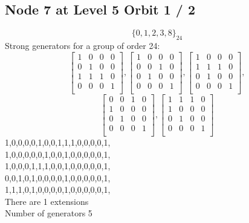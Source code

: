 \subsection*{Node 7 at Level 5 Orbit 1 / 2}
$$
\{ 0, 1, 2, 3, 8 \}_{24}$$
{\small\arraycolsep=2pt
Strong generators for a group of order 24:
$$
\left[
\begin{array}{*{4}{r}}
1 & 0 & 0 & 0\\
0 & 1 & 0 & 0\\
1 & 1 & 1 & 0\\
0 & 0 & 0 & 1\\
\end{array}
\right]
, 
\left[
\begin{array}{*{4}{r}}
1 & 0 & 0 & 0\\
0 & 0 & 1 & 0\\
0 & 1 & 0 & 0\\
0 & 0 & 0 & 1\\
\end{array}
\right]
, 
\left[
\begin{array}{*{4}{r}}
1 & 0 & 0 & 0\\
1 & 1 & 1 & 0\\
0 & 1 & 0 & 0\\
0 & 0 & 0 & 1\\
\end{array}
\right]
, 
$$
$$
\left[
\begin{array}{*{4}{r}}
0 & 0 & 1 & 0\\
1 & 0 & 0 & 0\\
0 & 1 & 0 & 0\\
0 & 0 & 0 & 1\\
\end{array}
\right]
, 
\left[
\begin{array}{*{4}{r}}
1 & 1 & 1 & 0\\
1 & 0 & 0 & 0\\
0 & 1 & 0 & 0\\
0 & 0 & 0 & 1\\
\end{array}
\right]
$$
1,0,0,0,0,1,0,0,1,1,1,0,0,0,0,1,\\
1,0,0,0,0,0,1,0,0,1,0,0,0,0,0,1,\\
1,0,0,0,1,1,1,0,0,1,0,0,0,0,0,1,\\
0,0,1,0,1,0,0,0,0,1,0,0,0,0,0,1,\\
1,1,1,0,1,0,0,0,0,1,0,0,0,0,0,1,\\
}
There are 1 extensions\\
Number of generators 5\\
